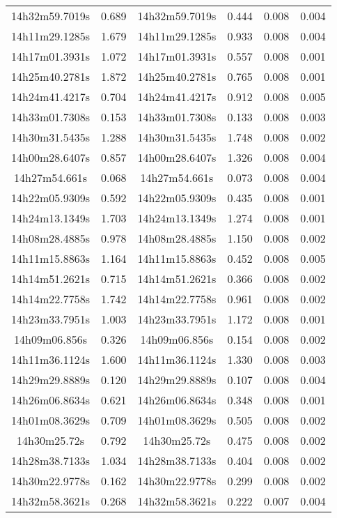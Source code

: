 \begin{table}
\begin{tabular}{cccccc}
14h32m59.7019s & 0.689 & 14h32m59.7019s & 0.444 & 0.008 & 0.004 \\
14h11m29.1285s & 1.679 & 14h11m29.1285s & 0.933 & 0.008 & 0.004 \\
14h17m01.3931s & 1.072 & 14h17m01.3931s & 0.557 & 0.008 & 0.001 \\
14h25m40.2781s & 1.872 & 14h25m40.2781s & 0.765 & 0.008 & 0.001 \\
14h24m41.4217s & 0.704 & 14h24m41.4217s & 0.912 & 0.008 & 0.005 \\
14h33m01.7308s & 0.153 & 14h33m01.7308s & 0.133 & 0.008 & 0.003 \\
14h30m31.5435s & 1.288 & 14h30m31.5435s & 1.748 & 0.008 & 0.002 \\
14h00m28.6407s & 0.857 & 14h00m28.6407s & 1.326 & 0.008 & 0.004 \\
14h27m54.661s & 0.068 & 14h27m54.661s & 0.073 & 0.008 & 0.004 \\
14h22m05.9309s & 0.592 & 14h22m05.9309s & 0.435 & 0.008 & 0.001 \\
14h24m13.1349s & 1.703 & 14h24m13.1349s & 1.274 & 0.008 & 0.001 \\
14h08m28.4885s & 0.978 & 14h08m28.4885s & 1.150 & 0.008 & 0.002 \\
14h11m15.8863s & 1.164 & 14h11m15.8863s & 0.452 & 0.008 & 0.005 \\
14h14m51.2621s & 0.715 & 14h14m51.2621s & 0.366 & 0.008 & 0.002 \\
14h14m22.7758s & 1.742 & 14h14m22.7758s & 0.961 & 0.008 & 0.002 \\
14h23m33.7951s & 1.003 & 14h23m33.7951s & 1.172 & 0.008 & 0.001 \\
14h09m06.856s & 0.326 & 14h09m06.856s & 0.154 & 0.008 & 0.002 \\
14h11m36.1124s & 1.600 & 14h11m36.1124s & 1.330 & 0.008 & 0.003 \\
14h29m29.8889s & 0.120 & 14h29m29.8889s & 0.107 & 0.008 & 0.004 \\
14h26m06.8634s & 0.621 & 14h26m06.8634s & 0.348 & 0.008 & 0.001 \\
14h01m08.3629s & 0.709 & 14h01m08.3629s & 0.505 & 0.008 & 0.002 \\
14h30m25.72s & 0.792 & 14h30m25.72s & 0.475 & 0.008 & 0.002 \\
14h28m38.7133s & 1.034 & 14h28m38.7133s & 0.404 & 0.008 & 0.002 \\
14h30m22.9778s & 0.162 & 14h30m22.9778s & 0.299 & 0.008 & 0.002 \\
14h32m58.3621s & 0.268 & 14h32m58.3621s & 0.222 & 0.007 & 0.004 \\

\end{tabular}
\end{table}
